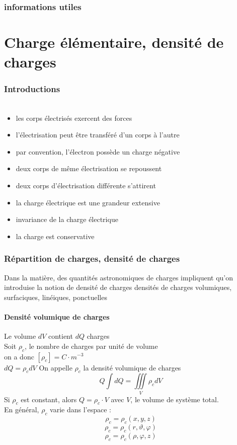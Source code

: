 \documentclass[../main.tex]{subfile}
\begin{document}
\section{informations utiles}
\part{Charge élémentaire, densité de charges}

\section{Introductions}
\begin{prop}
$\phantom{a}$
\begin{itemize}
	\item les corps électrisés exercent des forces
	\item l'électrisation peut être transféré d'un corps à l'autre
	\item par convention, l'électron possède un charge négative
	\item deux corps de même électrisation se repoussent 
	\item deux corps d'électrisation différente s'attirent
	\item la charge électrique est une grandeur extensive
	\item invariance de la charge électrique
	\item la charge est conservative
\end{itemize}
\end{prop}

\section{Répartition de charges, densité de charges}
Dans la matière, des quantités astronomiques de charges impliquent qu'on introduise la notion de densité de charges
densités de charges volumiques, surfaciques, linéiques, ponctuelles

\subsection{Densité volumique de charges}
Le volume $dV$ contient $dQ$ charges\\
Soit $\rho_c$, le nombre de charges par unité de volume\\
on a donc $[\rho_c] = C \cdot m^{-3}$\\
$dQ = \rho_cdV$
On appelle $\rho_c$ la densité volumique de charges\\
$$Q \int dQ = \iiint\limits_V \rho_cdV$$
Si $\rho_c$ est constant, alors $Q = \rho_c \cdot V$ avec $V$, le volume de système total.\\
En général, $\rho_c$ varie dans l'espace :\\
$$\rho_c = \rho_c(x, y, z)$$
$$\rho_c = \rho_c(r, \vartheta, \varphi)$$
$$\rho_c = \rho_c(\rho, \varphi, z)$$
\end{document}
